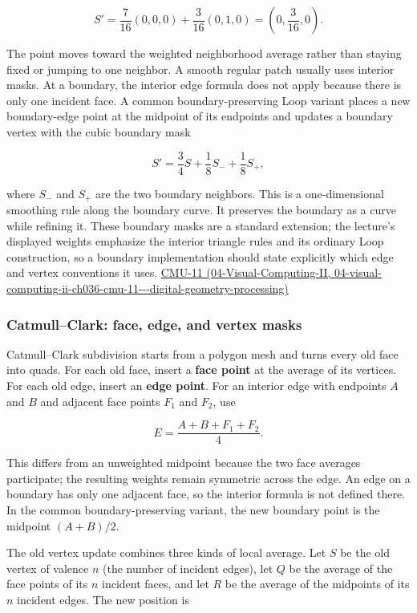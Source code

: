 \[
S'=\frac{7}{16}(0,0,0)+\frac{3}{16}(0,1,0)
=\left(0,\frac{3}{16},0\right).
\]

The point moves toward the weighted neighborhood average rather than staying fixed or jumping to one neighbor. A smooth regular patch usually uses interior masks. At a boundary, the interior edge formula does not apply because there is only one incident face. A common boundary-preserving Loop variant places a new boundary-edge point at the midpoint of its endpoints and updates a boundary vertex with the cubic boundary mask

\[
S'=\frac{3}{4}S+\frac{1}{8}S_{-}+\frac{1}{8}S_{+},
\]

where \(S_{-}\) and \(S_{+}\) are the two boundary neighbors. This is a one-dimensional smoothing rule along the boundary curve. It preserves the boundary as a curve while refining it. These boundary masks are a standard extension; the lecture's displayed weights emphasize the interior triangle rules and its ordinary Loop construction, so a boundary implementation should state explicitly which edge and vertex conventions it uses. \href{../04-Visual-Computing-II/main.pdf\#nameddest=04-visual-computing-ii-ch036-cmu-11---digital-geometry-processing}{CMU-11 (04-Visual-Computing-II, 04-visual-computing-ii-ch036-cmu-11-\/-\/-digital-geometry-processing)}

\subsubsection{Catmull--Clark: face, edge, and vertex masks}\label{03-visual-computing-i-ch002-catmullclark-face-edge-and-vertex-masks}

Catmull--Clark subdivision starts from a polygon mesh and turns every old face into quads. For each old face, insert a \textbf{face point} at the average of its vertices. For each old edge, insert an \textbf{edge point}. For an interior edge with endpoints \(A\) and \(B\) and adjacent face points \(F_1\) and \(F_2\), use

\[
E=\frac{A+B+F_1+F_2}{4}.
\]

This differs from an unweighted midpoint because the two face averages participate; the resulting weights remain symmetric across the edge. An edge on a boundary has only one adjacent face, so the interior formula is not defined there. In the common boundary-preserving variant, the new boundary point is the midpoint \((A+B)/2\).

The old vertex update combines three kinds of local average. Let \(S\) be the old vertex of valence \(n\) (the number of incident edges), let \(Q\) be the average of the face points of its \(n\) incident faces, and let \(R\) be the average of the midpoints of its \(n\) incident edges. The new position is

